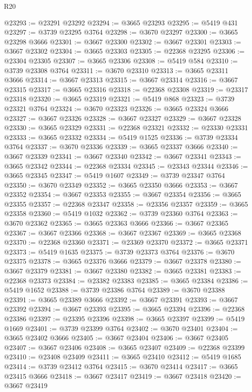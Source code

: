 \begin{lexlean}{R20}
\begin{coremodule}
@23293 := @23291 @23292
@23294 := @3665 @23293
@23295 := @5419 @431
@23297 := @3739 @23295 @3764
@23298 := @3670 @23297
@23300 := @3665 @23298 @3666
@23301 := @3667 @23300
@23302 := @3667 @23301
@23303 := @3667 @23302
@23304 := @3665 @23303
@23305 := @22368 @23295
@23306 := @23304 @23305
@23307 := @3665 @23306
@23308 := @5419 @584
@23310 := @3739 @23308 @3764
@23311 := @3670 @23310
@23313 := @3665 @23311 @3666
@23314 := @3667 @23313
@23315 := @3667 @23314
@23316 := @3667 @23315
@23317 := @3665 @23316
@23318 := @22368 @23308
@23319 := @23317 @23318
@23320 := @3665 @23319
@23321 := @5419 @868
@23323 := @3739 @23321 @3764
@23324 := @3670 @23323
@23326 := @3665 @23324 @3666
@23327 := @3667 @23326
@23328 := @3667 @23327
@23329 := @3667 @23328
@23330 := @3665 @23329
@23331 := @22368 @23321
@23332 := @23330 @23331
@23333 := @3665 @23332
@23334 := @5419 @1525
@23336 := @3739 @23334 @3764
@23337 := @3670 @23336
@23339 := @3665 @23337 @3666
@23340 := @3667 @23339
@23341 := @3667 @23340
@23342 := @3667 @23341
@23343 := @3665 @23342
@23344 := @22368 @23334
@23345 := @23343 @23344
@23346 := @3665 @23345
@23347 := @5419 @1607
@23349 := @3739 @23347 @3764
@23350 := @3670 @23349
@23352 := @3665 @23350 @3666
@23353 := @3667 @23352
@23354 := @3667 @23353
@23355 := @3667 @23354
@23356 := @3665 @23355
@23357 := @22368 @23347
@23358 := @23356 @23357
@23359 := @3665 @23358
@23360 := @5419 @1032
@23362 := @3739 @23360 @3764
@23363 := @3670 @23362
@23365 := @3665 @23363 @3666
@23366 := @3667 @23365
@23367 := @3667 @23366
@23368 := @3667 @23367
@23369 := @3665 @23368
@23370 := @22368 @23360
@23371 := @23369 @23370
@23372 := @3665 @23371
@23373 := @5419 @1635
@23375 := @3739 @23373 @3764
@23376 := @3670 @23375
@23378 := @3665 @23376 @3666
@23379 := @3667 @23378
@23380 := @3667 @23379
@23381 := @3667 @23380
@23382 := @3665 @23381
@23383 := @22368 @23373
@23384 := @23382 @23383
@23385 := @3665 @23384
@23386 := @5419 @1652
@23388 := @3739 @23386 @3764
@23389 := @3670 @23388
@23391 := @3665 @23389 @3666
@23392 := @3667 @23391
@23393 := @3667 @23392
@23394 := @3667 @23393
@23395 := @3665 @23394
@23396 := @22368 @23386
@23397 := @23395 @23396
@23398 := @3665 @23397
@23399 := @5419 @1669
@23401 := @3739 @23399 @3764
@23402 := @3670 @23401
@23404 := @3665 @23402 @3666
@23405 := @3667 @23404
@23406 := @3667 @23405
@23407 := @3667 @23406
@23408 := @3665 @23407
@23409 := @22368 @23399
@23410 := @23408 @23409
@23411 := @3665 @23410
@23412 := @5419 @1685
@23414 := @3739 @23412 @3764
@23415 := @3670 @23414
@23417 := @3665 @23415 @3666
@23418 := @3667 @23417
@23419 := @3667 @23418
@23420 := @3667 @23419

\end{coremodule}
\end{lexlean}
